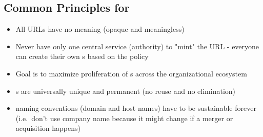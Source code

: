 \subsection*{Common Principles for }

\begin{itemize}
  \item All URLs have no meaning (opaque and meaningless)
  \item Never have only one central service (authority) to "mint" the URL - everyone can create their own
        s based on the policy
  \item Goal is to maximize proliferation of s across the organizational ecosystem
  \item {}s are universally unique and permanent (no reuse and no elimination)
  \item {} naming conventions (domain and host names) have to be sustainable forever
        (i.e.\ don't use company name because it might change if a merger or acquisition happens)
\end{itemize}

